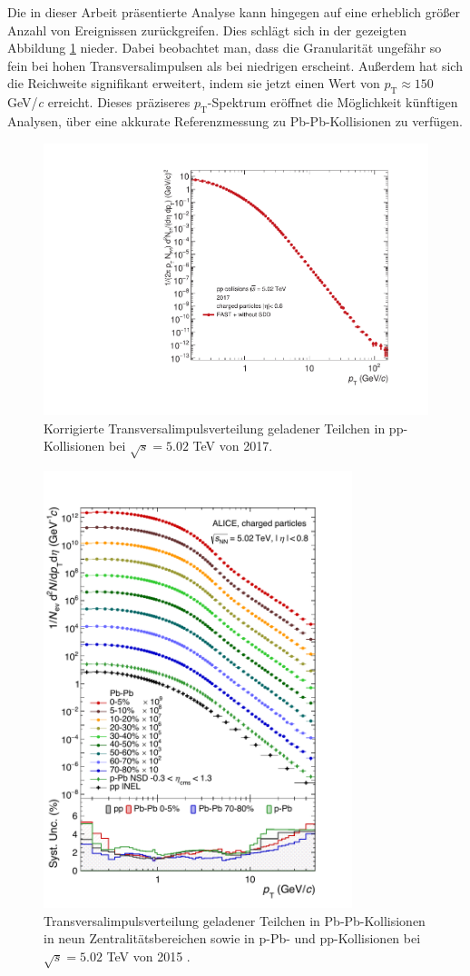 \documentclass[12pt,a4paper]{report}
\begin{document}
Die in dieser Arbeit präsentierte Analyse kann hingegen auf eine erheblich größer Anzahl von Ereignissen zurückgreifen. Dies schlägt sich in der gezeigten Abbildung \ref{correctedSpectrum} nieder. Dabei beobachtet man, dass die Granularität ungefähr so fein bei hohen Transversalimpulsen als bei niedrigen erscheint. Außerdem hat sich die Reichweite signifikant erweitert, indem sie jetzt einen Wert von $p_{\mathrm{T}} \approx 150$ GeV/\textit{c} erreicht. Dieses präziseres $p_{\mathrm{T}}$-Spektrum eröffnet die Möglichkeit künftigen Analysen, über eine akkurate Referenzmessung zu Pb-Pb-Kollisionen zu verfügen.
\begin{figure}[tb!]
\centering
\includegraphics[width=12.5cm]{Plots/correctedSpectrum.pdf}  
\caption{Korrigierte Transversalimpulsverteilung geladener Teilchen in pp-Kollisionen bei $\sqrt{s} = 5.02$ TeV von 2017.}
\label{correctedSpectrum}
\end{figure}
\begin{figure}[H]
\centering
\includegraphics[width=9cm]{Plots/PublishedResults.pdf}  
\caption{Transversalimpulsverteilung geladener Teilchen in Pb-Pb-Kollisionen in neun Zentralitätsbereichen sowie in p-Pb- und pp-Kollisionen bei $\sqrt{s} = 5.02$ TeV von 2015 \cite{Acharya:2018qsh}.}
\label{PublishedResults}
\end{figure}
\end{document}
